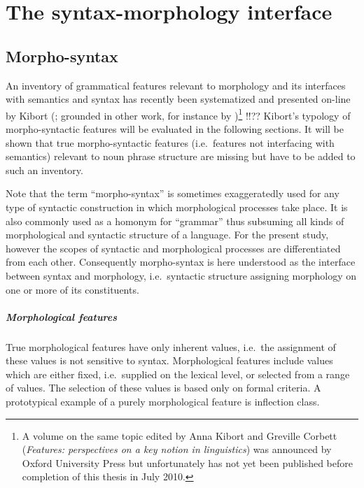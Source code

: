
\chapter{The syntax-morphology interface} \label{syntax-morphology-interface}

\section{Morpho-syntax}

An inventory of grammatical features relevant to morphology and its interfaces with semantics and syntax has recently been systematized and presented on-line by Kibort (\citeyear{kibort2008a}; grounded in other work, for instance by \citealt{aronoff1994,corbett1987,carstairs-mccarthy1999,corbett2006,corbett-etal2006,bickel-etal2007})\footnote{A volume on the same topic edited by Anna Kibort and Greville Corbett (\emph{Features: perspectives on a key notion in linguistics}) was announced by Oxford University Press but unfortunately has not yet been published before completion of this thesis in July 2010.} !!?? Kibort's typology of morpho-syntactic features will be evaluated in the following sections. It will be shown that true morpho-syntactic features (i.e.~features not interfacing with semantics) relevant to noun phrase structure are missing but have to be added to such an inventory.

Note that the term “morpho-syntax” is sometimes exaggeratedly used for any type of syntactic construction in which morphological processes take place. It is also commonly used as a homonym for “grammar” thus subsuming all kinds of morphological and syntactic structure of a language. For the present study, however the scopes of syntactic and morphological processes are differentiated from each other. Consequently morpho-syntax is here understood as the interface between syntax and morphology, i.e.~syntactic structure assigning morphology on one or more of its constituents.

\paragraph{Morphological features} True morphological features have only inherent values, i.e.~the assignment of these values is not sensitive to syntax. Morphological features include values which are either fixed, i.e.~supplied on the lexical level, or selected from a range of values. The selection of these values is based only on formal criteria. A prototypical example of a purely morphological feature is inflection class.

